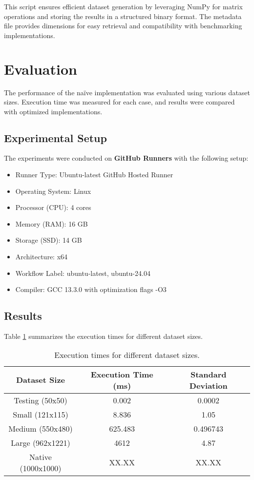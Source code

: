 \documentclass[12pt]{article}
\begin{document}
This script ensures efficient dataset generation by leveraging NumPy for matrix operations and storing the results in a structured binary format. The metadata file provides dimensions for easy retrieval and compatibility with benchmarking implementations.

\section{Evaluation}
The performance of the naïve implementation was evaluated using various dataset sizes. Execution time was measured for each case, and results were compared with optimized implementations.

\subsection{Experimental Setup}
The experiments were conducted on \textbf{GitHub Runners} with the following setup:
\begin{itemize}
    \item Runner Type: Ubuntu-latest GitHub Hosted Runner
    \item Operating System: Linux
    \item Processor (CPU): 4 cores
    \item Memory (RAM): 16 GB
    \item Storage (SSD): 14 GB
    \item Architecture: x64
    \item Workflow Label: ubuntu-latest, ubuntu-24.04
    \item Compiler: GCC 13.3.0 with optimization flags -O3
\end{itemize}

\subsection{Results}
Table \ref{tab:results} summarizes the execution times for different dataset sizes.

\begin{table}[h]
    \begin{tabular}{|c|c|c|}
        \hline
        \textbf{Dataset Size} & \textbf{Execution Time (ms)} & \textbf{Standard Deviation} \\
        \hline
        Testing (50x50) & 0.002 & 0.0002 \\
        Small (121x115) & 8.836 & 1.05 \\
        Medium (550x480) & 625.483 & 0.496743 \\
        Large (962x1221) & 4612 & 4.87 \\
        Native (1000x1000) & XX.XX & XX.XX \\
        \hline
    \end{tabular}
        \caption{Execution times for different dataset sizes.}
        \label{tab:results}
    \end{table}
    \newpage
\end{document}
